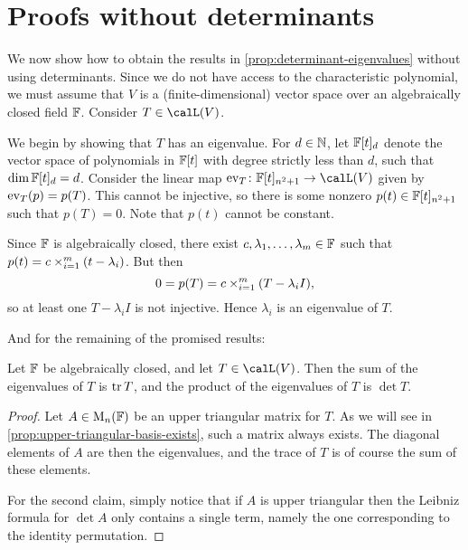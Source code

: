 \section{Proofs without determinants}

We now show how to obtain the results in \cref{prop:determinant-eigenvalues} without using determinants. Since we do not have access to the characteristic polynomial, we must assume that $V$ is a (finite-dimensional) vector space over an algebraically closed field $\mathbb{F}$. Consider $T \in \lin(V)$.


We begin by showing that $T$ has an eigenvalue. For $d \in \mathbb{N}$, let $\mathbb{F}[t]_d$ denote the vector space of polynomials in $\mathbb{F}[t]$ with degree strictly less than $d$, such that $\dim \mathbb{F}[t]_d = d$. Consider the linear map $\ev_T \colon \fieldF[t]_{n^2+1} \to \lin(V)$ given by $\mathrm{ev}_T(p) = p(T)$. This cannot be injective, so there is some nonzero $p(t) \in \mathbb{F}[t]_{n^2+1}$ such that $p(T) = 0$. Note that $p(t)$ cannot be constant.

Since $\mathbb{F}$ is algebraically closed, there exist $c, \lambda_1, \ldots, \lambda_m \in \mathbb{F}$ such that $p(t) = c \bigprod_{i=1}^m (t - \lambda_i)$. But then
%
\begin{equation*}
    0
        = p(T)
        = c \bigprod_{i=1}^m (T - \lambda_i I),
\end{equation*}
%
so at least one $T - \lambda_i I$ is not injective. Hence $\lambda_i$ is an eigenvalue of $T$.


And for the remaining of the promised results:

\begin{corollary}
    Let $\mathbb{F}$ be algebraically closed, and let $T \in \lin(V)$. Then the sum of the eigenvalues of $T$ is $\operatorname{tr} T$, and the product of the eigenvalues of $T$ is $\det T$.
\end{corollary}

\begin{proof}
    Let $A \in \mathrm{M}_{n}(\mathbb{F})$ be an upper triangular matrix for $T$. As we will see in \cref{prop:upper-triangular-basis-exists}, such a matrix always exists. The diagonal elements of $A$ are then the eigenvalues, and the trace of $T$ is of course the sum of these elements.

    For the second claim, simply notice that if $A$ is upper triangular then the Leibniz formula for $\det A$ only contains a single term, namely the one corresponding to the identity permutation.
\end{proof}